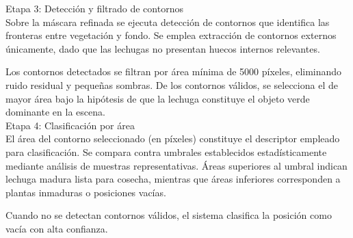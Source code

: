 Etapa 3: Detección y filtrado de contornos\\
\noindent
Sobre la máscara refinada se ejecuta detección de contornos que identifica las fronteras entre vegetación y fondo. Se emplea extracción de contornos externos únicamente, dado que las lechugas no presentan huecos internos relevantes.

Los contornos detectados se filtran por área mínima de 5000 píxeles, eliminando ruido residual y pequeñas sombras. De los contornos válidos, se selecciona el de mayor área bajo la hipótesis de que la lechuga constituye el objeto verde dominante en la escena.\\

Etapa 4: Clasificación por área\\
\noindent
El área del contorno seleccionado (en píxeles) constituye el descriptor empleado para clasificación. Se compara contra umbrales establecidos estadísticamente mediante análisis de muestras representativas. Áreas superiores al umbral indican lechuga madura lista para cosecha, mientras que áreas inferiores corresponden a plantas inmaduras o posiciones vacías.

Cuando no se detectan contornos válidos, el sistema clasifica la posición como vacía con alta confianza.


